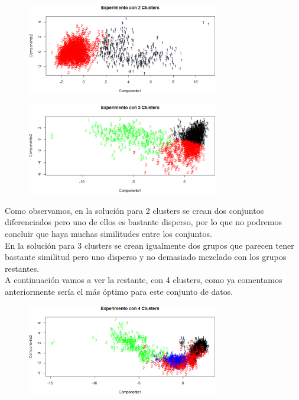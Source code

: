 \documentclass[10pt]{article}
\begin{document}
\begin{figure}[H]
	\begin{center}
 		\includegraphics[width = 0.75\textwidth]{Imagenes/2clusters.eps}
	\end{center} 
\end{figure}


\begin{figure}[H]
	\begin{center}
 		\includegraphics[width = 0.75\textwidth]{Imagenes/3clusters.eps}
	\end{center} 
\end{figure}

Como observamos, en la solución para 2 clusters se crean dos conjuntos diferenciados pero uno de ellos es bastante disperso, por lo que no podremos concluir que haya muchas similitudes entre los conjuntos.\\

En la solución para 3 clusters se crean igualmente dos grupos que parecen tener bastante similitud pero uno disperso y no demasiado mezclado con los grupos restantes.\\

A continuación vamos a ver la restante, con 4 clusters, como ya comentamos anteriormente sería el más óptimo para este conjunto de datos.\\

\begin{figure}[H]
	\begin{center}
 		\includegraphics[width = 0.75\textwidth]{Imagenes/4clusters.eps}
	\end{center} 
\end{figure}
\end{document}

